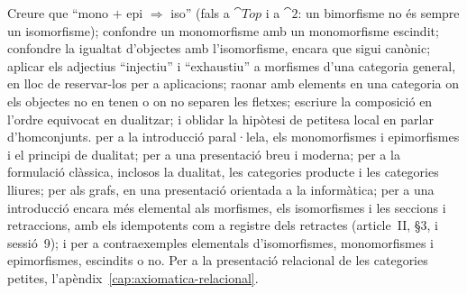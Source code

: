 \begin{resumcap}
\begin{enumerate}
\end{enumerate}
 Creure que \enquote{mono $+$ epi $\Rightarrow$ iso} (fals a $\cat{Top}$ i a $\cat{2}$: un bimorfisme no és sempre un isomorfisme); confondre un monomorfisme amb un monomorfisme escindit; confondre la igualtat d'objectes amb l'isomorfisme, encara que sigui canònic; aplicar els adjectius \enquote{injectiu} i \enquote{exhaustiu} a morfismes d'una categoria general, en lloc de reservar-los per a aplicacions; raonar amb elements en una categoria on els objectes no en tenen o on no separen les fletxes; escriure la composició en l'ordre equivocat en dualitzar; i oblidar la hipòtesi de petitesa local en parlar d'homconjunts.
 \cite[cap.~1, §2.1 i §3.1]{awodey} per a la introducció paral·lela, els monomorfismes i epimorfismes i el principi de dualitat; \cite[§1.1]{leinster} per a una presentació breu i moderna; \cite[cap.~I i II.1--II.3, II.7]{maclane} per a la formulació clàssica, inclosos la dualitat, les categories producte i les categories lliures; \cite[§1.3]{barrwells} per als grafs, en una presentació orientada a la informàtica; \cite[parts~I--II, sessions~2--10]{lawvereschanuel} per a una introducció encara més elemental als morfismes, els isomorfismes i les seccions i retraccions, amb els idempotents com a registre dels retractes (article~II, §3, i sessió~9); i \cite[§1.1.5 i §1.2]{perrone-notes} per a contraexemples elementals d'isomorfismes, monomorfismes i epimorfismes, escindits o no. Per a la presentació relacional de les categories petites, l'apèndix~\ref{cap:axiomatica-relacional}.
\end{resumcap}
